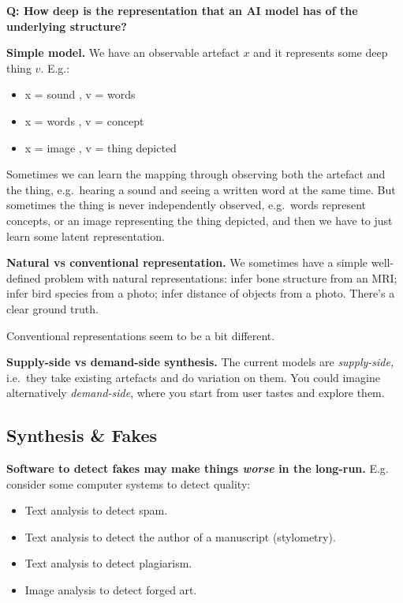 \documentclass[
  11pt,
  letterpaper,
  DIV=11,
  numbers=noendperiod,
  oneside]{scrartcl}
\providecommand{\tightlist}{%
  \setlength{\itemsep}{0pt}\setlength{\parskip}{0pt}}\usepackage{longtable,booktabs,array}
\begin{document}
\textbf{Q: How deep is the representation that an AI model has of the
underlying structure?}

\textbf{Simple model.} We have an observable artefact \(x\) and it
represents some deep thing \(v\). E.g.:

\begin{itemize}
\tightlist
\item
  x = sound , v = words
\item
  x = words , v = concept
\item
  x = image , v = thing depicted
\end{itemize}

Sometimes we can learn the mapping through observing both the artefact
and the thing, e.g.~hearing a sound and seeing a written word at the
same time. But sometimes the thing is never independently observed,
e.g.~words represent concepts, or an image representing the thing
depicted, and then we have to just learn some latent representation.

\textbf{Natural vs conventional representation.} We sometimes have a
simple well-defined problem with natural representations: infer bone
structure from an MRI; infer bird species from a photo; infer distance
of objects from a photo. There's a clear ground truth.

Conventional representations seem to be a bit different.

\textbf{Supply-side vs demand-side synthesis.} The current models are
\emph{supply-side,} i.e.~they take existing artefacts and do variation
on them. You could imagine alternatively \emph{demand-side}, where you
start from user tastes and explore them.

\hypertarget{synthesis-fakes}{%
\subsection{Synthesis \& Fakes}\label{synthesis-fakes}}

\textbf{Software to detect fakes may make things \emph{worse} in the
long-run.} E.g. consider some computer systems to detect quality:

\begin{itemize}
\tightlist
\item
  Text analysis to detect spam.
\item
  Text analysis to detect the author of a manuscript (stylometry).
\item
  Text analysis to detect plagiarism.
\item
  Image analysis to detect forged art.
\end{itemize}
\end{document}

